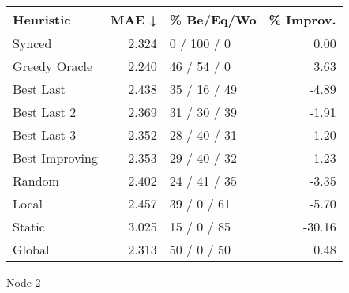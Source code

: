 \begin{tabular}{lrlr}
\toprule
\textbf{Heuristic} & \textbf{MAE ↓} & \textbf{\% Be/Eq/Wo} & \textbf{\% Improv.} \\
\midrule
            Synced &          2.324 &          0 / 100 / 0 &                0.00 \\
     Greedy Oracle &          2.240 &          46 / 54 / 0 &                3.63 \\
         Best Last &          2.438 &         35 / 16 / 49 &               -4.89 \\
       Best Last 2 &          2.369 &         31 / 30 / 39 &               -1.91 \\
       Best Last 3 &          2.352 &         28 / 40 / 31 &               -1.20 \\
    Best Improving &          2.353 &         29 / 40 / 32 &               -1.23 \\
            Random &          2.402 &         24 / 41 / 35 &               -3.35 \\
             Local &          2.457 &          39 / 0 / 61 &               -5.70 \\
            Static &          3.025 &          15 / 0 / 85 &              -30.16 \\
            Global &          2.313 &          50 / 0 / 50 &                0.48 \\
\bottomrule
\end{tabular}
\caption{Node 2}
\label{tab:hr_iid_lr05_le2_bs2_2}
